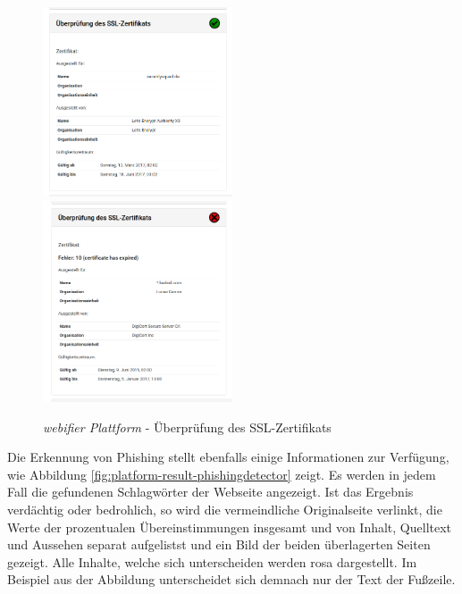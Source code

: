 \begin{figure}[H]
\centerline{%
\includegraphics[width=0.5\textwidth]{images/platform/certificatechecker-clean}%
\includegraphics[width=0.5\textwidth]{images/platform/certificatechecker-malicious}%
}%
\caption{\textit{webifier Plattform} - Überprüfung des SSL-Zertifikats}
\label{fig:platform-result-certificatechecker}
\end{figure}

\newpage

Die Erkennung von Phishing stellt ebenfalls einige Informationen zur Verfügung, wie Abbildung
\ref{fig:platform-result-phishingdetector} zeigt. Es werden in jedem Fall die gefundenen
Schlagwörter der Webseite angezeigt. Ist das Ergebnis verdächtig oder bedrohlich, so wird die
vermeindliche Originalseite verlinkt, die Werte der prozentualen Übereinstimmungen insgesamt und
von Inhalt, Quelltext und Aussehen separat aufgelistst und ein Bild der beiden überlagerten Seiten
gezeigt. Alle Inhalte, welche sich unterscheiden werden rosa dargestellt. Im Beispiel aus der
Abbildung unterscheidet sich demnach nur der Text der Fußzeile.

